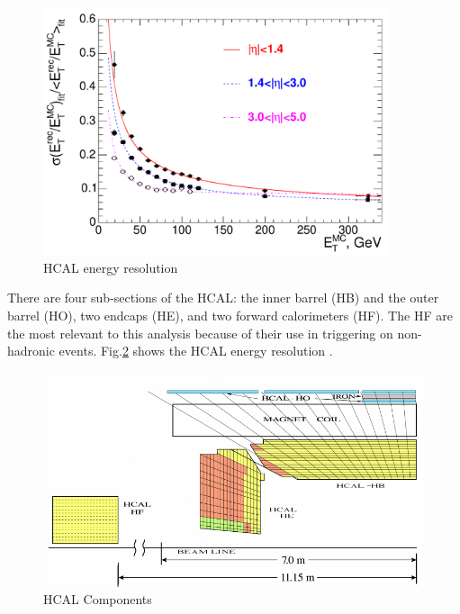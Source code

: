 \begin{figure}[]
\begin{centering}
\includegraphics[width=4in]{Chapter3/importfigs/Figure_001-008.pdf}
\par\end{centering}
\caption{HCAL energy resolution \cite{Bayatian:2006nff}\label{fig:hcalRes}}
\end{figure}

There are four sub-sections of the HCAL: the inner barrel (HB) and the outer barrel (HO), two endcaps (HE), and two forward calorimeters (HF). The HF are the most relevant to this analysis because of their use in triggering on non-hadronic events. Fig.\ref{fig:hcalComp} shows the HCAL energy resolution \cite{Bayatian:2006nff}.

\begin{figure}[]
\begin{centering}
\includegraphics[width=5in]{Chapter3/importfigs/filtering_noise_in_CMS_hadron_calorimeter.png}
\par\end{centering}
\caption{HCAL Components \cite{Bayatian:2006nff} \label{fig:hcalComp}}
\end{figure}


